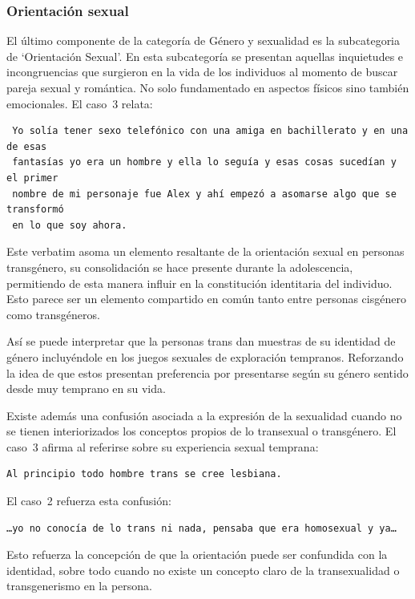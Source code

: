 \subsubsection{Orientación sexual}

El último componente de la categoría de Género y sexualidad es la subcategoria
de ‘Orientación Sexual’. En esta subcategoría se presentan aquellas inquietudes
e incongruencias que surgieron en la vida de los individuos al momento de buscar
pareja sexual y romántica. No solo fundamentado en aspectos físicos sino también
emocionales. El caso~3 relata:

\begin{verbatim}
 Yo solía tener sexo telefónico con una amiga en bachillerato y en una de esas
 fantasías yo era un hombre y ella lo seguía y esas cosas sucedían y el primer
 nombre de mi personaje fue Alex y ahí empezó a asomarse algo que se transformó
 en lo que soy ahora.
\end{verbatim}

Este verbatim asoma un elemento resaltante de la orientación sexual en personas
transgénero, su consolidación se hace presente durante la adolescencia,
permitiendo de esta manera influir en la constitución identitaria del individuo.
Esto parece ser un elemento compartido en común tanto entre personas cisgénero
como transgéneros.

Así se puede interpretar que la personas trans dan muestras de su identidad de
género incluyéndole en los juegos sexuales de exploración tempranos. Reforzando
la idea de que estos presentan preferencia por presentarse según su género
sentido desde muy temprano en su vida.

Existe además una confusión asociada a la expresión de la sexualidad cuando no
se tienen interiorizados los conceptos propios de lo transexual o transgénero.
El caso~3 afirma al referirse sobre su experiencia sexual temprana:

\begin{verbatim}
Al principio todo hombre trans se cree lesbiana.
\end{verbatim}

El caso~2 refuerza esta confusión:

\begin{verbatim}
…yo no conocía de lo trans ni nada, pensaba que era homosexual y ya…
\end{verbatim}

Esto refuerza la concepción de que la orientación puede ser confundida con la
identidad, sobre todo cuando no existe un concepto claro de la transexualidad o
transgenerismo en la persona.

